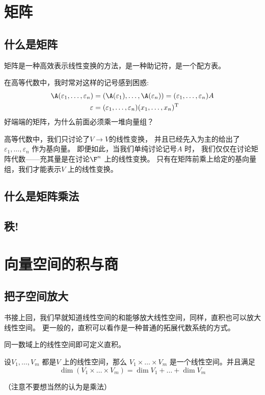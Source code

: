 \section{矩阵}
\subsection{什么是矩阵}
矩阵是一种高效表示线性变换的方法，是一种助记符，是一个配方表。

在高等代数中，我时常对这样的记号感到困惑:
\begin{align*}
  \A(\varepsilon_{1}, \dots, \varepsilon_{n}) &=
  (\A(\varepsilon_{1}), \dots,
  \A(\varepsilon_{n})) = (\varepsilon_{1},
  \dots, \varepsilon_{n})A\\
  \varepsilon &= (\varepsilon_{1}, \dots, \varepsilon_{n})
  (x_{1}, \dots,   x_{n})^{\mathrm{T}}
\end{align*}
好端端的矩阵，为什么前面必须乘一堆向量组？

高等代数中，我们只讨论了\(V \to V\)的线性变换，
并且已经先入为主的给出了\(\varepsilon_{1}, \dots, \varepsilon_{n}\) 作为基向量。
即便如此，当我们单纯讨论记号\(A\) 时，
我们仅仅在讨论矩阵代数——充其量是在讨论\(\F^{n}\) 上的线性变换。
只有在矩阵前乘上给定的基向量组，我们才能表示\(V\) 上的线性变换。

\subsection{什么是矩阵乘法}
\subsection{秩!}
\section{向量空间的积与商}
\subsection{把子空间放大}
书接上回，我们早就知道线性空间的和能够放大线性空间，同样，直积也可以放大线性空间。
更一般的，直积可以看作是一种普通的拓展代数系统的方式。

同一数域上的线性空间即可定义直积。

\begin{theorem}
  设\(V_1, \dots , V_{m}\) 都是\(V\) 上的线性空间，那么 \(V_{1}
  \times \dots \times V_{m}\) 是一个线性空间。并且满足\[
    \dim (V_{1} \times \dots \times V_{m}) = \dim V_{1}
    + \dots + \dim V_{m}
  \]
\end{theorem}
（注意不要想当然的认为是乘法）

